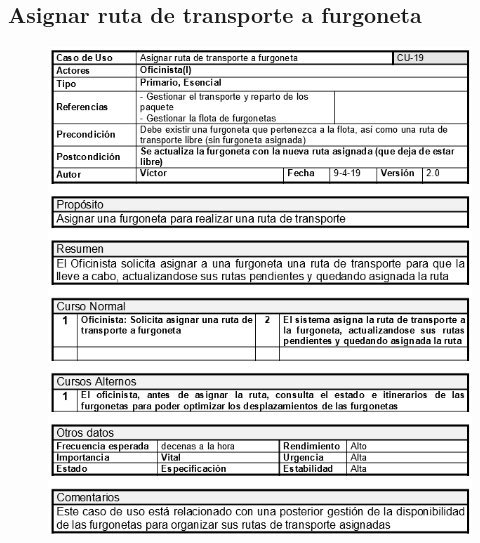 \subsection{Asignar ruta de transporte a furgoneta}
\begin{figure}[H]
	\centering
	\includegraphics[width=16cm]{19}
\end{figure}
